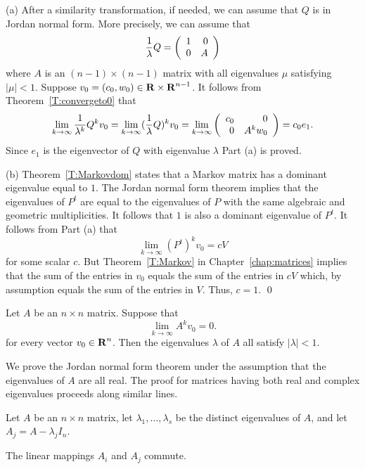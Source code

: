\proof  (a) After a similarity transformation, if needed, 
we can assume that $Q$ is in 
Jordan normal form.  More precisely, we can assume that 
\[
\frac{1}{\lambda}Q = \left(\begin{array}{rr} 1 & 0\\ 0 &A\end{array}\right)
\]
where $A$ is an $(n-1)\times (n-1)$ matrix with all eigenvalues $\mu$
satisfying $|\mu|<1$.  Suppose $v_0=(c_0,w_0)\in\mbox{$\bf{R}$}\times\mbox{$\bf{R}$}^{n-1}$.  It 
follows from Theorem~\ref{T:convergeto0} that 
\[
\lim_{k\to\infty}\frac{1}{\lambda^k}Q^kv_0 = 
\lim_{k\to\infty}(\frac{1}{\lambda}Q)^kv_0 =
\lim_{k\to\infty}\left(\begin{array}{rr} c_0 & 0\\ 0 &A^kw_0\end{array}\right) = c_0e_1.
\]
Since $e_1$ is the eigenvector of $Q$ with eigenvalue $\lambda$ Part (a) 
is proved.

(b)   Theorem~\ref{T:Markovdom} states that a Markov matrix has a dominant 
eigenvalue equal to $1$.  The Jordan normal form theorem implies that the 
eigenvalues of $P^t$ are equal to the eigenvalues of $P$ with the same 
algebraic and geometric multiplicities.  It follows that $1$ is also a 
dominant eigenvalue of $P^t$.  It follows from Part (a) that
\[
\lim_{k\to\infty}(P^t)^kv_0 = cV
\]
for some scalar $c$.  But Theorem~\ref{T:Markov} in 
Chapter~\ref{chap:matrices} implies that the sum of the
entries in $v_0$ equals the sum of the entries in $cV$ which, by assumption
equals the sum of the entries in $V$.  Thus, $c=1$.   \qed





\EXER

\TEXER

\begin{exercise} \label{c10.6.1}
Let $A$ be an $n\times n$ matrix.   Suppose that 
\[
\lim_{k\to\infty} A^kv_0 = 0.
\]
for every vector $v_0\in\mbox{$\bf{R}$}^n$.  Then the eigenvalues $\lambda$ of $A$ all
satisfy $|\lambda|<1$.
\end{exercise}






\label{S:Jordan} 

We prove the Jordan normal form theorem under the assumption that the 
eigenvalues of $A$ are all real.  The proof for matrices having both real and 
complex eigenvalues proceeds along similar lines.

Let $A$ be an $n\times n$ matrix, let $\lambda_1,\ldots,\lambda_s$ be the
distinct eigenvalues of $A$, and let $A_j = A-\lambda_jI_n$.

\begin{lemma}  \label{L:commute}
The linear mappings $A_i$ and $A_j$ commute.
\end{lemma}

